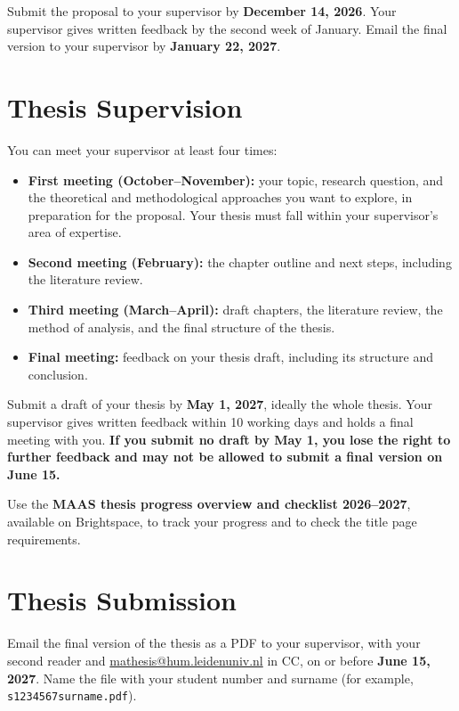 \documentclass[11pt,a4paper]{article}
\begin{document}
Submit the proposal to your supervisor by \textbf{December 14, 2026}. Your supervisor gives written feedback by the second week of January. Email the final version to your supervisor by \textbf{January 22, 2027}.

\section{Thesis Supervision}

You can meet your supervisor at least four times:

\begin{itemize}
    \item \textbf{First meeting (October--November):} your topic, research question, and the theoretical and methodological approaches you want to explore, in preparation for the proposal. Your thesis must fall within your supervisor's area of expertise.
    \item \textbf{Second meeting (February):} the chapter outline and next steps, including the literature review.
    \item \textbf{Third meeting (March--April):} draft chapters, the literature review, the method of analysis, and the final structure of the thesis.
    \item \textbf{Final meeting:} feedback on your thesis draft, including its structure and conclusion.
\end{itemize}

Submit a draft of your thesis by \textbf{May 1, 2027}, ideally the whole thesis. Your supervisor gives written feedback within 10 working days and holds a final meeting with you. \textbf{If you submit no draft by May 1, you lose the right to further feedback and may not be allowed to submit a final version on June 15.}

Use the \textbf{MAAS thesis progress overview and checklist 2026--2027}, available on Brightspace, to track your progress and to check the title page requirements.

\section{Thesis Submission}

Email the final version of the thesis as a PDF to your supervisor, with your second reader and \href{mailto:mathesis@hum.leidenuniv.nl}{mathesis@hum.leidenuniv.nl} in CC, on or before \textbf{June 15, 2027}. Name the file with your student number and surname (for example, \texttt{s1234567surname.pdf}).
\end{document}
